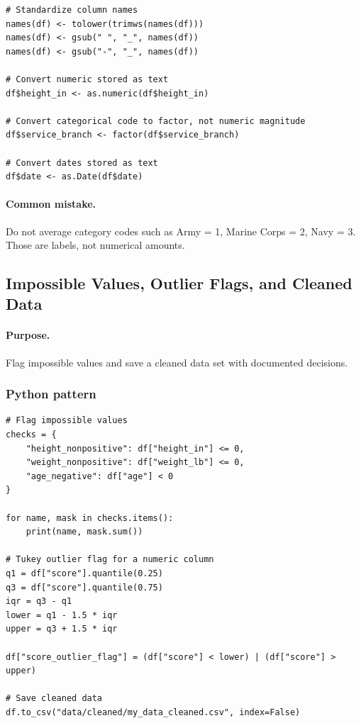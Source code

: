 \begin{verbatim}
# Standardize column names
names(df) <- tolower(trimws(names(df)))
names(df) <- gsub(" ", "_", names(df))
names(df) <- gsub("-", "_", names(df))

# Convert numeric stored as text
df$height_in <- as.numeric(df$height_in)

# Convert categorical code to factor, not numeric magnitude
df$service_branch <- factor(df$service_branch)

# Convert dates stored as text
df$date <- as.Date(df$date)
\end{verbatim}

\paragraph{Common mistake.} Do not average category codes such as Army = 1, Marine Corps = 2, Navy = 3.  Those are labels, not numerical amounts.

\subsection{Impossible Values, Outlier Flags, and Cleaned Data}
\label{app:ch03-software-cookbook-impossible-outliers-save}

\paragraph{Purpose.} Flag impossible values and save a cleaned data set with documented decisions.

\subsubsection*{Python pattern}

\begin{verbatim}
# Flag impossible values
checks = {
    "height_nonpositive": df["height_in"] <= 0,
    "weight_nonpositive": df["weight_lb"] <= 0,
    "age_negative": df["age"] < 0
}

for name, mask in checks.items():
    print(name, mask.sum())

# Tukey outlier flag for a numeric column
q1 = df["score"].quantile(0.25)
q3 = df["score"].quantile(0.75)
iqr = q3 - q1
lower = q1 - 1.5 * iqr
upper = q3 + 1.5 * iqr

df["score_outlier_flag"] = (df["score"] < lower) | (df["score"] > upper)

# Save cleaned data
df.to_csv("data/cleaned/my_data_cleaned.csv", index=False)
\end{verbatim}

